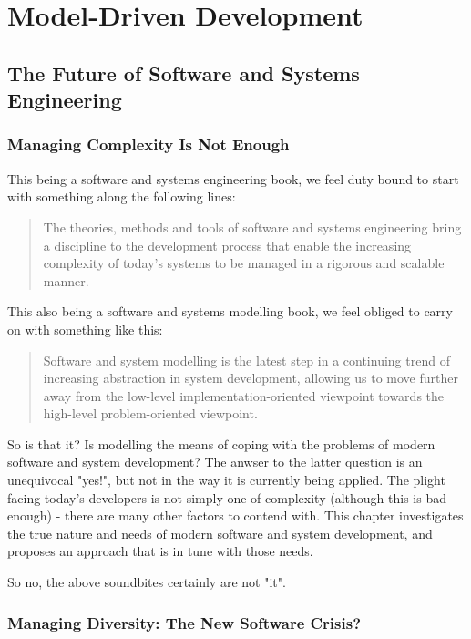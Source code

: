\chapter{Model-Driven Development}
\label{mddchapter}



\section{The Future of Software and Systems Engineering} \label{futureengineering}

\subsection{Managing Complexity Is Not Enough} \label{complexityanddiversity}

This being a software and systems engineering book, we feel duty bound to start with something along the following lines:

\begin{quote}
The theories, methods and tools of software and systems engineering bring a discipline to the development process that enable the increasing complexity of today's systems to be managed in a rigorous and scalable manner.
\end{quote}

This also being a software and systems modelling book, we feel obliged to carry on with something like this:

\begin{quote}
Software and system modelling is the latest step in a continuing trend of increasing abstraction in system development, allowing us to move further away from the low-level implementation-oriented viewpoint towards the high-level problem-oriented viewpoint.
\end{quote}

So is that it? Is modelling the means of coping with the problems of modern software and system development? The anwser to the latter question is an unequivocal "yes!", but not in the way it is currently being applied. The plight facing today's developers is not simply one of complexity (although this is bad enough) - there are many other factors to contend with. This chapter investigates the true nature and needs of modern software and system development, and proposes an approach that is in tune with those needs.

So no, the above soundbites certainly are not "it".

\subsection{Managing Diversity: The New Software Crisis?} \label{diversity}

